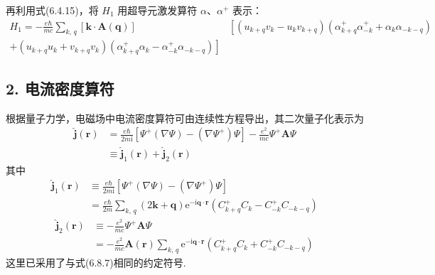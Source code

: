 再利用式(6.4.15)，将 $H_{1}$ 用超导元激发算符 $\alpha$、$\alpha^{+}$ 表示：
\begin{equation}
\begin{aligned}
  H_{1}=-\frac{e\hbar}{mc}\sum_{k,\,q}
  \left[\boldsymbol{k}\cdot\boldsymbol{A}(\boldsymbol{q})\right]
  &\left[\left(u_{k+q}v_{k}-u_{k}v_{k+q}\right)
  \left(\alpha^{+}_{k+q}\alpha^{+}_{-k}
  +\alpha_{k}\alpha_{-k-q}\right)\right.\\
  \left.+\left(u_{k+q}u_{k}+v_{k+q}v_{k}\right)
  \left(\alpha^{+}_{k+q}\alpha_{k}
  -\alpha^{+}_{-k}\alpha_{-k-q}\right)\right]
\end{aligned}
\end{equation}

\subsection*{2. 电流密度算符}

根据量子力学，电磁场中电流密度算符可由连续性方程导出，其二次量子化表示为
\begin{equation}
\begin{aligned}
  \hat{\boldsymbol{j}}(\boldsymbol{r})
  &=\frac{e\hbar}{2m\mathrm{i}}\left[\Psi^{+}\left(\nabla\Psi\right)
  -\left(\nabla\Psi^{+}\right)\Psi\right]
  -\frac{e^{2}}{mc}\Psi^{+}\boldsymbol{A}\Psi\\
  &\equiv\hat{\boldsymbol{j}}_{1}(\boldsymbol{r})+\hat{\boldsymbol{j}}_{2}(\boldsymbol{r})
\end{aligned}
\end{equation}
其中
\begin{equation}
\begin{aligned}
  \hat{\boldsymbol{j}}_{1}(\boldsymbol{r})
  &\equiv\frac{e\hbar}{2m\mathrm{i}}\left[\Psi^{+}\left(\nabla\Psi\right)
  -\left(\nabla\Psi^{+}\right)\Psi\right]\\
  &=\frac{e\hbar}{2m}\sum_{k,\,q}\left(2\boldsymbol{k}+\boldsymbol{q}\right)
  \mathrm{e}^{-\mathrm{i}\boldsymbol{q}\cdot\boldsymbol{r}}
  \left(C^{+}_{k+q}C_{k}-C^{+}_{-k}C_{-k-q}\right)
\end{aligned}
\end{equation}
\begin{equation}
\begin{aligned}
  \hat{\boldsymbol{j}}_{2}(\boldsymbol{r})
  &\equiv-\frac{e^{2}}{mc}\Psi^{+}\boldsymbol{A}\Psi\\
  &=-\frac{e^{2}}{mc}\boldsymbol{A}(\boldsymbol{r})\sum_{k,\,q}
  \mathrm{e}^{-\mathrm{i}\boldsymbol{q}\cdot\boldsymbol{r}}
  \left(C^{+}_{k+q}C_{k}+C^{+}_{-k}C_{-k-q}\right)
\end{aligned}
\end{equation}
这里已采用了与式(6.8.7)相同的约定符号.

